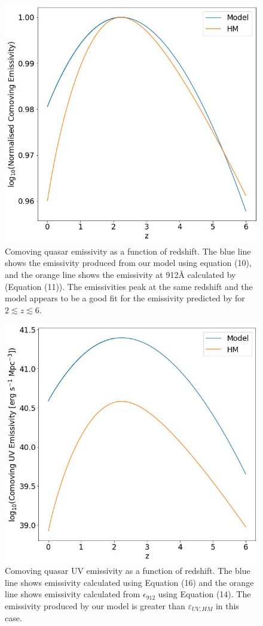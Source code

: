 \documentclass[12pt]{article}%
\begin{document}
\begin{figure}[H]
\centering
\includegraphics[width=12cm]{Plot_7_3.jpeg}
\caption{Comoving quasar emissivity as a function of redshift. The blue line shows the emissivity produced from our model using equation (10), and the orange line shows the emissivity at 912\AA \: calculated by \cite{Haardt_Madau} (Equation (11)). The emissivities peak at the same redshift and the model appears to be a good fit for the emissivity predicted by \citeauthor{Haardt_Madau} for $2\lesssim z\lesssim6$.}
\label{fig:8}
\end{figure}

\begin{figure}[H]
\centering
\includegraphics[width=12cm]{Plot_8.jpeg}
\caption{Comoving quasar UV emissivity as a function of redshift. The blue line shows emissivity calculated using Equation (16) and the orange line shows emissivity calculated from $\epsilon_{912}$ using Equation (14). The emissivity produced by our model is greater than $\varepsilon_{UV,HM}$ in this case.}
\label{fig:9}
\end{figure}
\end{document}

